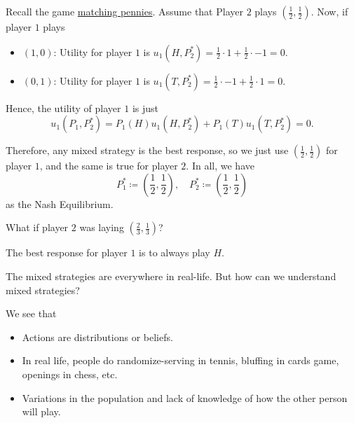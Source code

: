 \begin{prev}
	Recall the game \hyperref[matching-pennies]{matching pennies}. Assume that Player \(2\) plays \((\frac{1}{2}, \frac{1}{2})\).
	Now, if player \(1\) plays
	\begin{itemize}
		\item \((1, 0)\): Utility for player \(1\) is \(u_1(H, P^{*}_2) = \frac{1}{2}\cdot 1 + \frac{1}{2}\cdot -1 = 0\).
		\item \((0, 1)\): Utility for player \(1\) is \(u_1(T, P^{*}_2) = \frac{1}{2}\cdot -1 + \frac{1}{2}\cdot 1 = 0\).
	\end{itemize}
	Hence, the utility of player \(1\) is just
	\[
		u_1(P_1, P^{*}_2) = P_1(H)u_1(H, P^{*}_2)+P_1(T)u_1(T, P^{*}_2) = 0.
	\]

	Therefore, any mixed strategy is the best response, so we just use \((\frac{1}{2}, \frac{1}{2})\) for player \(1\), and the same is
	true for player \(2\). In all, we have
	\[
		P_1^{*}\coloneqq \left(\frac{1}{2}, \frac{1}{2}\right), \quad P_2^{*}\coloneqq \left(\frac{1}{2}, \frac{1}{2}\right)
	\]
	as the Nash Equilibrium.

	\begin{problem}
	What if player \(2\) was laying \(\left(\frac{2}{3}, \frac{1}{3}\right)\)?
	\end{problem}
	\begin{answer}
		The best response for player \(1\) is to always play \(H\).
	\end{answer}
\end{prev}

\hr

\begin{problem}
The mixed strategies are everywhere in real-life. But how can we understand mixed strategies?
\end{problem}
\begin{answer}
	We see that
	\begin{itemize}
		\item Actions are distributions or beliefs.
		\item In real life, people do randomize-serving in tennis, bluffing in cards game, openings in chess, etc.
		\item Variations in the population and lack of knowledge of how the other person will play.
	\end{itemize}
\end{answer}

